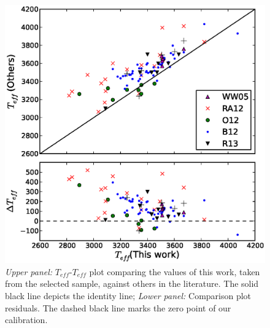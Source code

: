\documentclass{aa}
\begin{document}
\begin{figure}[]
\begin{center}
\includegraphics[scale=0.5]{pics/compteffv3.eps}
\end{center}
\caption{\textit{Upper panel:} $T_{eff}$-$T_{eff}$ plot comparing the values of this work, taken from the selected sample, against others in the literature. The solid black line depicts the identity line; \textit{Lower panel:} Comparison plot residuals. The dashed black line marks the zero point of our calibration.}
\label{fig:compteff}
\end{figure}
\end{document}
